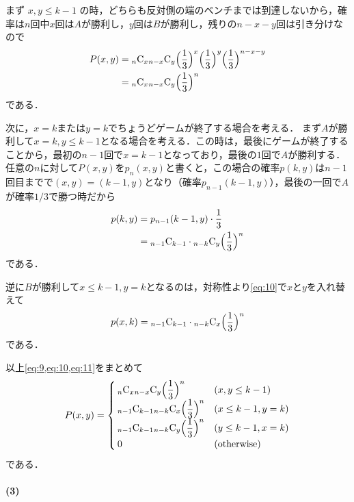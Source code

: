 \documentclass[../../main.tex]{subfiles}
\begin{document}
まず $x, y \le k-1$ の時，どちらも反対側の端のベンチまでは到達しないから，確率は$n$回中$x$回は$A$が勝利し，$y$回は$B$が勝利し，残りの$n-x-y$回は引き分けなので
\begin{align}
  P(x, y) &= {}_n\text{C}_x {}_{n-x}\text{C}_y \Bigl(\dfrac{1}{3}\Bigr)^x \Bigl(\dfrac{1}{3}\Bigr)^y \Bigl(\dfrac{1}{3}\Bigr)^{n-x-y} \\
  &= {}_n\text{C}_x {}_{n-x}\text{C}_y \Bigl(\dfrac{1}{3}\Bigr)^n \label{eq:9}
\end{align}
である．

次に，$x=k$または$y=k$でちょうどゲームが終了する場合を考える．
まず$A$が勝利して$x =k, y \le k-1$となる場合を考える．この時は，最後にゲームが終了することから，最初の$n-1$回で$x=k-1$となっており，最後の$1$回で$A$が勝利する．任意の$n$に対して$P(x,y)$を$p_n(x,y)$と書くと，この場合の確率$p(k,y)$は$n-1$回目までで$(x,y)=(k-1,y)$となり（確率$p_{n-1}(k-1,y)$），最後の一回で$A$が確率$1/3$で勝つ時だから
\begin{align}
  p(k,y)
  &= p_{n-1}(k-1,y)\cdot \dfrac{1}{3} \\
  &= {}_{n-1}\text{C}_{k-1} \cdot {}_{n-k}\text{C}_{y}\Bigl(\dfrac{1}{3}\Bigr)^n \label{eq:10}
\end{align}
である．

逆に$B$が勝利して$x\le k-1,y=k$となるのは，対称性より\cref{eq:10}で$x$と$y$を入れ替えて
\begin{align}
  p(x,k) = {}_{n-1}\text{C}_{k-1} \cdot {}_{n-k}\text{C}_{x}\Bigl(\dfrac{1}{3}\Bigr)^n \label{eq:11}
\end{align}
である．

以上\cref{eq:9,eq:10,eq:11}をまとめて
\begin{align}
  P(x, y) =
  \begin{cases}
    {}_n\text{C}_x {}_{n-x}\text{C}_y \Bigl(\dfrac{1}{3}\Bigr)^n & (x, y \le k-1) \\
    {}_{n-1}\text{C}_{k-1} {}_{n-k}\text{C}_x \Bigl(\dfrac{1}{3}\Bigr)^n & (x \le k-1, y = k) \\
    {}_{n-1}\text{C}_{k-1} {}_{n-k}\text{C}_y \Bigl(\dfrac{1}{3}\Bigr)^n & (y \le k-1, x = k) \\
    0 & (\text{otherwise})
  \end{cases} \label{eq:12}
\end{align}
である．

\paragraph{(3)}
\end{document}
